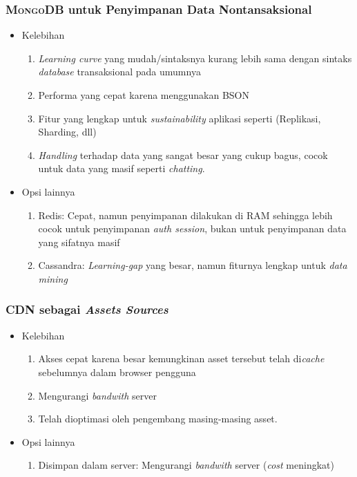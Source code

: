 	\subsubsection{\textsc{MongoDB} untuk Penyimpanan Data Nontansaksional}
		\begin{itemize}
			\item Kelebihan
			\begin{enumerate}
				\item \textit{Learning curve} yang mudah/sintaksnya kurang lebih sama dengan sintaks \textit{database} transaksional pada umumnya
				\item Performa yang cepat karena menggunakan BSON
				\item Fitur yang lengkap untuk \textit{sustainability} aplikasi seperti (Replikasi, Sharding, dll)
				\item \textit{Handling} terhadap data yang sangat besar yang cukup bagus, cocok untuk data yang masif seperti \textit{chatting}.
			\end{enumerate}
			\item Opsi lainnya
			\begin{enumerate}
				\item Redis:  Cepat, namun penyimpanan dilakukan di RAM sehingga lebih cocok untuk penyimpanan \textit{auth session}, bukan untuk penyimpanan data yang sifatnya masif
				\item Cassandra:  \textit{Learning-gap} yang besar, namun fiturnya lengkap untuk \textit{data mining}
			\end{enumerate}
		\end{itemize}
		
		
	\subsubsection{\textsc{CDN} sebagai \textit{Assets Sources}}
		\begin{itemize}
			\item Kelebihan
			\begin{enumerate}
				\item Akses cepat karena besar kemungkinan asset tersebut telah di\textit{cache} sebelumnya dalam browser pengguna
				\item Mengurangi \textit{bandwith} server
				\item Telah dioptimasi oleh pengembang masing-masing asset.
			\end{enumerate}
			\item Opsi lainnya
			\begin{enumerate}
				\item Disimpan dalam server: Mengurangi \textit{bandwith} server (\textit{cost} meningkat)
			\end{enumerate}
		\end{itemize}
		
